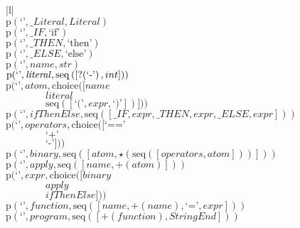 \footnotesize\begin{center}\begin{tabular}{|l|}\hline
{}
\\\hline
$\mathrm{p}(\text{`'},\mathit{\_ Literal},\mathit{Literal})$	\\
$\mathrm{p}(\text{`'},\mathit{\_ IF},\text{`if'})$	\\
$\mathrm{p}(\text{`'},\mathit{\_ THEN},\text{`then'})$	\\
$\mathrm{p}(\text{`'},\mathit{\_ ELSE},\text{`else'})$	\\
$\mathrm{p}(\text{`'},\mathit{name},str)$	\\
$\mathrm{p}(\text{`'},\mathit{literal},\mathrm{seq}\left(\left[\mathord{?}\! \left(\text{`-'}\right), int\right]\right))$	\\
$\mathrm{p}(\text{`'},\mathit{atom},\mathrm{choice}([\mathit{name}$\\$\qquad\qquad\mathit{literal}$\\$\qquad\qquad\mathrm{seq}\left(\left[\text{`('}, \mathit{expr}, \text{`)'}\right]\right)]))$	\\
$\mathrm{p}(\text{`'},\mathit{ifThenElse},\mathrm{seq}\left(\left[\mathit{\_ IF}, \mathit{expr}, \mathit{\_ THEN}, \mathit{expr}, \mathit{\_ ELSE}, \mathit{expr}\right]\right))$	\\
$\mathrm{p}(\text{`'},\mathit{operators},\mathrm{choice}([\text{`=='}$\\$\qquad\qquad\text{`+'}$\\$\qquad\qquad\text{`-'}]))$	\\
$\mathrm{p}(\text{`'},\mathit{binary},\mathrm{seq}\left(\left[\mathit{atom}, \star \left(\mathrm{seq}\left(\left[\mathit{operators}, \mathit{atom}\right]\right)\right)\right]\right))$	\\
$\mathrm{p}(\text{`'},\mathit{apply},\mathrm{seq}\left(\left[\mathit{name}, \plus \left(\mathit{atom}\right)\right]\right))$	\\
$\mathrm{p}(\text{`'},\mathit{expr},\mathrm{choice}([\mathit{binary}$\\$\qquad\qquad\mathit{apply}$\\$\qquad\qquad\mathit{ifThenElse}]))$	\\
$\mathrm{p}(\text{`'},\mathit{function},\mathrm{seq}\left(\left[\mathit{name}, \plus \left(\mathit{name}\right), \text{`='}, \mathit{expr}\right]\right))$	\\
$\mathrm{p}(\text{`'},\mathit{program},\mathrm{seq}\left(\left[\plus \left(\mathit{function}\right), \mathit{StringEnd}\right]\right))$	\\
\hline\end{tabular}\end{center}

